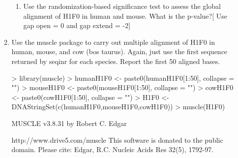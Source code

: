 \documentclass[12pt,a4paper]{paper}
\begin{document}
\begin{enumerate}
\begin{enumerate}
\begin{enumerate}
\item Use the randomization-based significance test to assess the global alignment of H1F0 in human and mouse. What is the p-value?[ Use gap open = 0 and gap extend = -2]
\end{enumerate}
\item Use the muscle package to carry out multiple alignment of H1F0 in human, mouse, and cow (bos taurus). Again, just use the first sequence returned by seqinr for each species. Report the first 50 aligned bases.
\begin{Schunk}
\begin{Sinput}
> library(muscle)
> humanH1F0 <- paste0(humanH1F0[1:50], collapse = "")
> mouseH1F0 <- paste0(mouseH1F0[1:50], collapse = "")
> cowH1F0 <- paste0(cowH1F0[1:50], collapse = "")
> H1F0 <- DNAStringSet(c(humanH1F0,mouseH1F0,cowH1F0))
> muscle(H1F0)
\end{Sinput}
\begin{Soutput}
MUSCLE v3.8.31 by Robert C. Edgar

http://www.drive5.com/muscle
This software is donated to the public domain.
Please cite: Edgar, R.C. Nucleic Acids Res 32(5), 1792-97.


\end{Soutput}
\end{Schunk}
\end{enumerate}
\end{enumerate}
\end{document}
